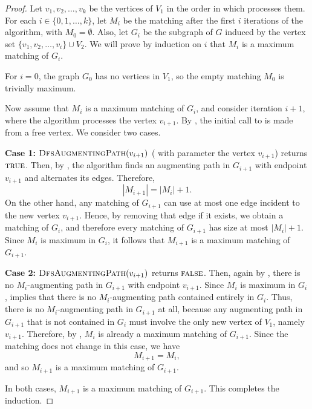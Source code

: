 \documentclass[12pt]{report}
\numberwithin{algorithm}{chapter}
\newcommand{\True}{\textsc{true}}
\newcommand{\False}{\textsc{false}}
\begin{document}
	\begin{proof}
		Let $v_{1},v_{2},\dots,v_{k}$ be the vertices of $V_{1}$ in the order in which  processes them. For each $i \in \{0,1,\dots,k\}$, let $M_{i}$ be the matching after the first $i$ iterations of the algorithm, with $M_{0} = \emptyset$. Also, let $G_{i}$ be the subgraph of $G$ induced by the vertex set $\{v_{1},v_{2},\dots,v_{i}\} \cup V_{2}$.
		We will prove by induction on $i$ that $M_{i}$ is a maximum matching of $G_{i}$.
	
		For $i=0$, the graph $G_{0}$ has no vertices in $V_{1}$, so the empty matching $M_{0}$ is trivially maximum.
	
		Now assume that $M_{i}$ is a maximum matching of $G_{i}$, and consider iteration $i+1$, where the algorithm processes the vertex $v_{i+1}$. By , the initial call to  is made from a free vertex. We consider two cases.
	
		\medskip
		\noindent\textbf{Case 1:} $\Call{DfsAugmentingPath}{v_{i+1}}$ ( with parameter the vertex $v_{i+1}$) returns $\True$. Then, by , the algorithm finds an augmenting path in $G_{i+1}$ with endpoint $v_{i+1}$ and alternates its edges. Therefore,
		\[
		|M_{i+1}| = |M_{i}| + 1.
		\]
		On the other hand, any matching of $G_{i+1}$ can use at most one edge incident to the new vertex $v_{i+1}$. Hence, by removing that edge if it exists, we obtain a matching of $G_{i}$, and therefore every matching of $G_{i+1}$ has size at most $|M_{i}| + 1$. Since $M_{i}$ is maximum in $G_{i}$, it follows that $M_{i+1}$ is a maximum matching of $G_{i+1}$.
	
		\medskip
		\noindent\textbf{Case 2:} $\Call{DfsAugmentingPath}{v_{i+1}}$ returns $\False$. Then, again by , there is no $M_{i}$-augmenting path in $G_{i+1}$ with endpoint $v_{i+1}$. Since $M_{i}$ is maximum in $G_{i}$,  implies that there is no $M_{i}$-augmenting path contained entirely in $G_{i}$. Thus, there is no $M_{i}$-augmenting path in $G_{i+1}$ at all, because any augmenting path in $G_{i+1}$ that is not contained in $G_{i}$ must involve the only new vertex of $V_{1}$, namely $v_{i+1}$. Therefore, by , $M_{i}$ is already a maximum matching of $G_{i+1}$. Since the matching does not change in this case, we have
		\[
		M_{i+1} = M_{i},
		\]
		and so $M_{i+1}$ is a maximum matching of $G_{i+1}$.
	
		\medskip
		In both cases, $M_{i+1}$ is a maximum matching of $G_{i+1}$. This completes the induction.
	\end{proof}
\end{document}
